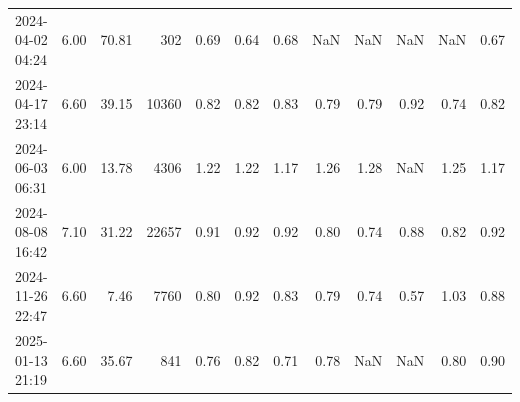 \begin{table}
\begin{tabular}{lrrrrrrrrrrr}
2024-04-02 04:24 & 6.00 & 70.81 & 302 & 0.69 & 0.64 & 0.68 & NaN & NaN & NaN & NaN & 0.67 \\
2024-04-17 23:14 & 6.60 & 39.15 & 10360 & 0.82 & 0.82 & 0.83 & 0.79 & 0.79 & 0.92 & 0.74 & 0.82 \\
2024-06-03 06:31 & 6.00 & 13.78 & 4306 & 1.22 & 1.22 & 1.17 & 1.26 & 1.28 & NaN & 1.25 & 1.17 \\
2024-08-08 16:42 & 7.10 & 31.22 & 22657 & 0.91 & 0.92 & 0.92 & 0.80 & 0.74 & 0.88 & 0.82 & 0.92 \\
2024-11-26 22:47 & 6.60 & 7.46 & 7760 & 0.80 & 0.92 & 0.83 & 0.79 & 0.74 & 0.57 & 1.03 & 0.88 \\
2025-01-13 21:19 & 6.60 & 35.67 & 841 & 0.76 & 0.82 & 0.71 & 0.78 & NaN & NaN & 0.80 & 0.90 \\
\bottomrule
\end{tabular}
\end{table}
